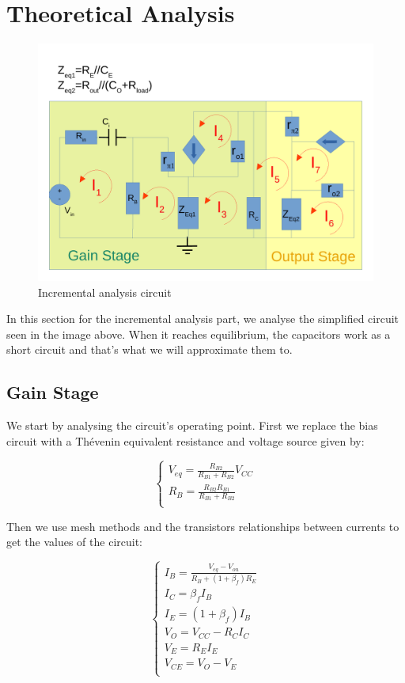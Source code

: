 \section{Theoretical Analysis}
\label{sec:analysis}


\begin{figure}[H] \centering
\includegraphics[width=0.7\linewidth]{../doc/circuit_freq.pdf}
\caption{Incremental analysis circuit}
\label{fig:simp_cir}
\end{figure}

In this section for the incremental analysis part, we analyse the simplified circuit seen in the image above. When it reaches equilibrium, the capacitors work as a short circuit and that's what we will approximate them to.

\subsection{Gain Stage}
We start by analysing the circuit's operating point.
First we replace the bias circuit with a Thévenin equivalent resistance and voltage source given by:

\begin{equation}\label{eq:v_eq}
\begin{cases}
V_{eq}=\frac{R_{B2}}{R_{B1}+R_{B2}} V_{CC} \\
R_B=\frac{R_{B2}R_{B1}}{R_{B1}+R_{B2}}\\
\end{cases}
\end{equation}

Then we use mesh methods and the transistors relationships between currents to get the values of the circuit:

\begin{equation}\label{eq:Op1}
\begin{cases}
I_B=\frac{V_{eq}-V_{on}}{R_B+(1+\beta_f)R_{E}}\\
I_C=\beta_f I_B\\
I_E=(1+\beta_f)I_B\\
V_O=V_{CC}-R_C I_C\\
V_E=R_E I_E\\
V_{CE}=V_O-V_E\\
\end{cases}
\end{equation}

